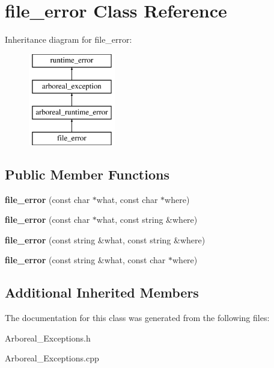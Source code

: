 \hypertarget{classfile__error}{}\section{file\+\_\+error Class Reference}
\label{classfile__error}
Inheritance diagram for file\+\_\+error\+:\begin{figure}[H]
\begin{center}
\leavevmode
\includegraphics[height=4.000000cm]{classfile__error}
\end{center}
\end{figure}
\subsection*{Public Member Functions}
\begin{DoxyCompactItemize}
\item 
\mbox{\label{classfile__error_ad1e39fb2d2fae7066afb0a5fd7d3ff95}} 
{\bfseries file\+\_\+error} (const char $\ast$what, const char $\ast$where)
\item 
\mbox{\label{classfile__error_a5f23b08102fc61c30e371c1e22bf407c}} 
{\bfseries file\+\_\+error} (const char $\ast$what, const string \&where)
\item 
\mbox{\label{classfile__error_a9fadb025f0b610e779ad25ba6c34f848}} 
{\bfseries file\+\_\+error} (const string \&what, const string \&where)
\item 
\mbox{\label{classfile__error_a714fe8ba3b7f1a443d434ed9b8965992}} 
{\bfseries file\+\_\+error} (const string \&what, const char $\ast$where)
\end{DoxyCompactItemize}
\subsection*{Additional Inherited Members}


The documentation for this class was generated from the following files\+:\begin{DoxyCompactItemize}
\item 
Arboreal\+\_\+\+Exceptions.\+h\item 
Arboreal\+\_\+\+Exceptions.\+cpp\end{DoxyCompactItemize}
